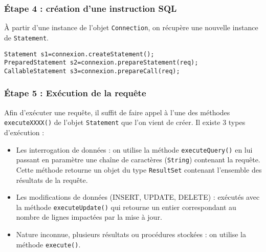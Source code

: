 \documentclass[xcolor=pdftex,x11names,table]{beamer}
\begin{document}
    \begin{frame}
    \frametitle{Étape 4 : création d’une instruction SQL}
	    À partir d'une instance de l’objet \lstinline$Connection$, on récupère une nouvelle instance de \lstinline$Statement$.
	    \begin{block}{}
    		\lstinline$Statement s1=connexion.createStatement();$\\
        \lstinline$PreparedStatement s2=connexion.prepareStatement(req);$\\
        \lstinline$CallableStatement s3=connexion.prepareCall(req);$
      \end{block}
    \end{frame}

    \begin{frame}
    \frametitle{Étape 5 : Exécution de la requête}
    	Afin d’exécuter une requête, il suffit de faire appel à l’une des méthodes \lstinline$executeXXXX()$
    	de l’objet \lstinline$Statement$ que l’on vient de créer. Il existe 3 types d'exécution : 
    	\begin{itemize}
    		\item Les interrogation de données : on utilise la méthode \lstinline$executeQuery()$ en lui passant 
				en paramètre une chaîne de caractères (\lstinline$String$) contenant la requête. Cette méthode retourne 
				un objet du type \lstinline$ResultSet$ contenant l'ensemble des résultats de la requête.
        \item Les modifications de données (INSERT, UPDATE, DELETE) :  exécutés avec la
				méthode \lstinline$executeUpdate()$ qui retourne un entier correspondant au nombre de lignes impactées par la mise à jour.
        \item Nature inconnue, plusieurs résultats ou procédures stockées : on utilise la méthode \lstinline$execute()$.
      \end{itemize}
    \end{frame}
    
\end{document}
